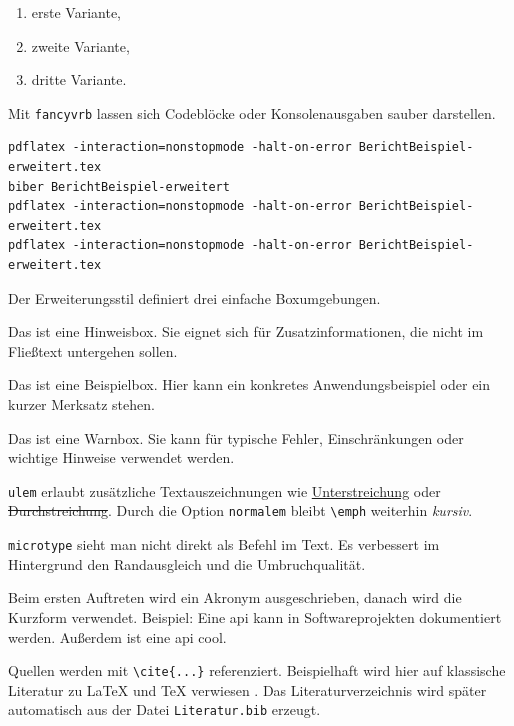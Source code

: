 \documentclass[12pt,a4paper]{article}
\begin{document}
\begin{Content}
	\begin{enumerate}[label=\alph*)]
		\item erste Variante,
		\item zweite Variante,
		\item dritte Variante.
	\end{enumerate}

	Mit \texttt{fancyvrb} lassen sich Codeblöcke oder Konsolenausgaben sauber darstellen.

	\begin{Verbatim}[frame=single, fontsize=\small]
pdflatex -interaction=nonstopmode -halt-on-error BerichtBeispiel-erweitert.tex
biber BerichtBeispiel-erweitert
pdflatex -interaction=nonstopmode -halt-on-error BerichtBeispiel-erweitert.tex
pdflatex -interaction=nonstopmode -halt-on-error BerichtBeispiel-erweitert.tex
	\end{Verbatim}

	Der Erweiterungsstil definiert drei einfache Boxumgebungen.

	\begin{HinweisBox}
		Das ist eine Hinweisbox. Sie eignet sich für Zusatzinformationen, die nicht im Fließtext untergehen sollen.
	\end{HinweisBox}

	\begin{BeispielBox}
		Das ist eine Beispielbox. Hier kann ein konkretes Anwendungsbeispiel oder ein kurzer Merksatz stehen.
	\end{BeispielBox}

	\begin{WarnungBox}
		Das ist eine Warnbox. Sie kann für typische Fehler, Einschränkungen oder wichtige Hinweise verwendet werden.
	\end{WarnungBox}

	\texttt{ulem} erlaubt zusätzliche Textauszeichnungen wie \uline{Unterstreichung} oder \sout{Durchstreichung}. Durch die Option \texttt{normalem} bleibt \verb|\emph| weiterhin \emph{kursiv}.

	\texttt{microtype} sieht man nicht direkt als Befehl im Text. Es verbessert im Hintergrund den Randausgleich und die Umbruchqualität.

	Beim ersten Auftreten wird ein Akronym ausgeschrieben, danach wird die Kurzform verwendet. Beispiel: Eine \gls{api} kann in Softwareprojekten dokumentiert werden. Außerdem ist eine \gls{api} cool.

	Quellen werden mit \verb|\cite{...}| referenziert. Beispielhaft wird hier auf klassische Literatur zu \LaTeX{} und \TeX{} verwiesen \cite{lamport1994latex,knuth1984texbook}. Das Literaturverzeichnis wird später automatisch aus der Datei \texttt{Literatur.bib} erzeugt.
\end{Content}
\end{document}
